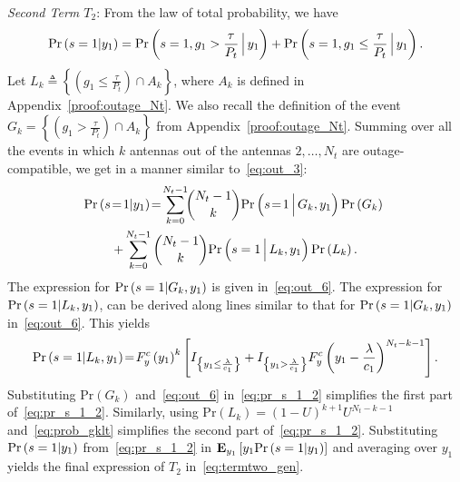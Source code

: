 \documentclass[12pt,draftcls,peerreview,onecolumn]{IEEEtran}
\newcommand{\brac}[1]{\left({#1}\right)}
\newcommand{\cbrac}[1]{\left\{{#1}\right\}}
\newcommand{\indic}[1]{I_{\cbrac{#1}}}
\newcommand{\define}{\triangleq}
\newcommand{\explow}[2]{{\bf{E}}_{#1}\left[{#2}\right]}
\newcommand{\prob}[1]{\text{Pr}\brac{#1}}
\newcommand{\given}{\arrowvert}
\newcommand{\Given}{\Big\arrowvert}
\newcommand{\nck}[2]{\binom{#1}{#2}}
\newcommand{\setA}{A}
\newcommand{\setAk}{\setA_{k}}
\newcommand{\setG}{G}
\newcommand{\setL}{L}
\newcommand{\setGk}{\setG_k}
\newcommand{\setLk}{\setL_k}
\newcommand{\lam}{\lambda}
\newcommand{\termtwo}{T_2}
\newcommand{\Nt}{{N_t}}
\newcommand{\Pt}{{P_t}}
\newcommand{\puch}{g}
\newcommand{\gk}[1]{{\puch_{#1}}}
\newcommand{\itau}{\tau}
\newcommand{\cone}{c_{1}}
\newcommand{\m}{\cone}
\newcommand{\taubypt}{\frac{\itau}{\Pt}}
\newcommand{\gkgrtaubypt}[1]{{\gk{#1}}>\taubypt}
\newcommand{\gklttaubypt}[1]{{\gk{#1}}\leq\taubypt}
\newcommand{\lambym}{\frac{\lam}{\m}}
\newcommand{\yk}[1]{y_{#1}}
\newcommand{\un}{U}
\begin{document}
{\em Second Term $\termtwo$}: From the law of total probability, we have 
%
\begin{equation}
\prob{s = 1\given \yk{1}} = \prob{s = 1,\gk{1}>\taubypt\Given\yk{1}}  + \prob{s = 1,\gk{1}\leq\taubypt\Given \yk{1}}. 
\label{eq:pr_s_1}
\end{equation}
%
Let  $\setLk\define\left\{\left(\gklttaubypt{1}\right)\cap\setAk \right\}$, where $\setAk$ is defined in Appendix~\ref{proof:outage_Nt}. We also recall  the definition of the event  $\setGk=\left\{\left(\gkgrtaubypt{1}\right)\cap\setAk \right\}$ from Appendix~\ref{proof:outage_Nt}.   Summing over all the events in which $k$ antennas out of the antennas $2,\ldots,\Nt$ are outage-compatible, we get in a manner similar to~\eqref{eq:out_3}:
\begin{multline}
\!\!\prob{s \!=\! 1\given \yk{1}}\! =\!\sum_{k=0}^{\Nt-1}\!\!\nck{\Nt-1}{k} 
\prob{s \!=\! 1 \Given \setGk , \yk{1}} \prob{\setGk}\\ + \sum_{k=0}^{\Nt-1}\nck{\Nt-1}{k}\prob{s = 1 \Given \setLk, \yk{1}} \prob{\setLk}. 
\label{eq:pr_s_1_2}
\end{multline}
% 
%
The expression for $\prob{s = 1\given \setGk, \yk{1}}$ is given in~\eqref{eq:out_6}.  The expression for $\prob{s = 1\given \setLk, \yk{1}}$, can be derived along lines similar to that for $\prob{s = 1\given \setGk, \yk{1}}$ in~\eqref{eq:out_6}. This yields   
\begin{equation}
\text{Pr}\brac{s =1\given \setLk,\yk{1}} \!=\! F_{y}^{c}\brac{\yk{1}}^{k}\left[\indic{\yk{1}\leq\lambym} +\indic{\yk{1}>\lambym}F_{y}^{c}\brac{\yk{1}-\lambym}^{\Nt-k-1}\right].
\label{eq:prob_gklt}
\end{equation}
%
Substituting $\prob{\setGk}$ and~\eqref{eq:out_6} in~\eqref{eq:pr_s_1_2} simplifies the first part of~\eqref{eq:pr_s_1_2}. Similarly, using $\prob{\setLk}=\left(1-\un\right)^{k+1}\un^{\Nt-k-1}$ and~\eqref{eq:prob_gklt} simplifies the second part of~\eqref{eq:pr_s_1_2}. Substituting $\prob{s = 1\given \yk{1}}$ from~\eqref{eq:pr_s_1_2} in $\explow{\yk{1}}{ \yk{1}\prob{s = 1\given \yk{1}}}$ and averaging over $\yk{1}$ yields the final expression of $\termtwo$ in~\eqref{eq:termtwo_gen}. 
\end{document}
